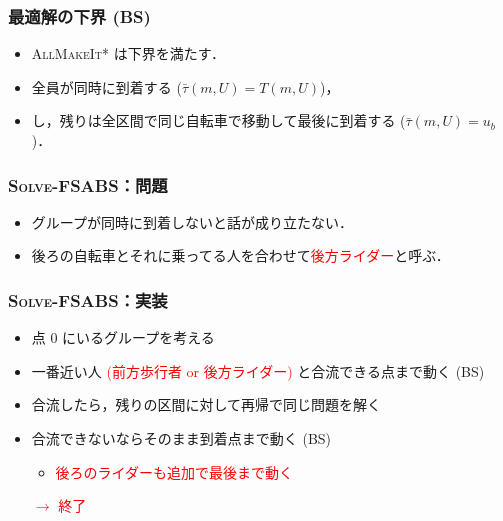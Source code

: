 \documentclass[dvipdfmx,12pt]{beamer}
\begin{document}
\begin{frame}
  \frametitle{最適解の下界 (BS)}
  \begin{itemize}
  \item \textsc{AllMakeIt*} は下界を満たす．
  \item 全員が同時に到着する ($\bar\tau(m, U) = T(m, U)$)，
  \item {}し，残りは全区間で同じ自転車で移動して最後に到着する ($\bar\tau(m, U) = u_b$)．
  \end{itemize}
\end{frame}

\begin{frame}
  \frametitle{\textsc{Solve-FSABS}：問題}
  \begin{itemize}
  \item グループが同時に到着しないと話が成り立たない．
  \item<2> 後ろの自転車とそれに乗ってる人を合わせて\textcolor{red}{後方ライダー}と呼ぶ．
  \end{itemize}
\end{frame}


\begin{frame}
  \frametitle{\textsc{Solve-FSABS}：実装}
  \begin{itemize}
  \item 点 0 にいるグループを考える
  \item 一番近い人 \textcolor{red}{(前方歩行者 or 後方ライダー)} と合流できる点まで動く (BS)
  \item 合流したら，残りの区間に対して再帰で同じ問題を解く
  \item 合流できないならそのまま到着点まで動く (BS)
    \begin{itemize}
    \item \textcolor{red}{後ろのライダーも追加で最後まで動く}
    \end{itemize}

    \textcolor{red}{$\rightarrow$ 終了}
  \end{itemize}
\end{frame}
\end{document}
